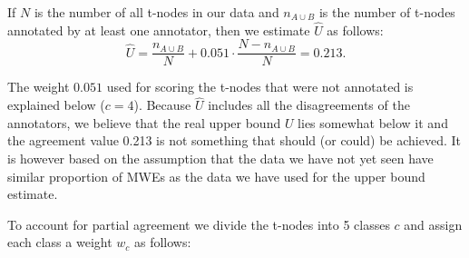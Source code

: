 If $N$ is the number of all t-nodes in our data and $n_{A \cup B}$ is the number of t-nodes annotated by at least one annotator, then we estimate $\widehat{U}$ as follows:
\begin{equation}
\label{eq-upper-bound}
\widehat{U} = \frac{n_{A \cup B}}{N} + 0.051 \cdot \frac{N - n_{A \cup B}}{N}= 0.213.
\end{equation}

The weight $0.051$ used for scoring the t-nodes that were not annotated is explained below ($c=4$). Because $\widehat{U}$ includes all the disagreements of the annotators, we believe that the real upper bound $U$ lies somewhat below it and the agreement value 0.213 is not something that should (or could) be achieved. It is however based on the assumption that the data we have not yet seen have similar proportion of MWEs as the data we have used for the upper bound estimate.

To account for partial agreement we divide the t-nodes into 5 classes $c$ and assign each class a weight $w_c$ as follows: 

